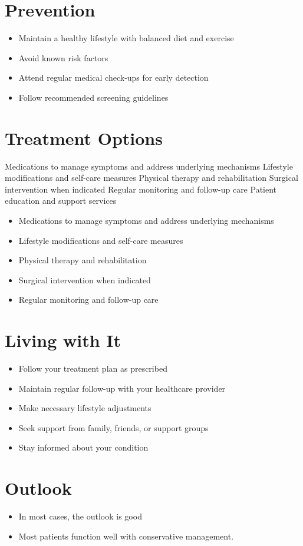 \section{Prevention}
\begin{itemize}[noitemsep]
  \item Maintain a healthy lifestyle with balanced diet and exercise
  \item Avoid known risk factors
  \item Attend regular medical check-ups for early detection
  \item Follow recommended screening guidelines
\end{itemize}
\section{Treatment Options}
Medications to manage symptoms and address underlying mechanisms Lifestyle modifications and self-care measures Physical therapy and rehabilitation Surgical intervention when indicated Regular monitoring and follow-up care Patient education and support services

\begin{itemize}[noitemsep]
  \item Medications to manage symptoms and address underlying mechanisms
  \item Lifestyle modifications and self-care measures
  \item Physical therapy and rehabilitation
  \item Surgical intervention when indicated
  \item Regular monitoring and follow-up care
\end{itemize}
\section{Living with It}
\begin{itemize}[noitemsep]
  \item Follow your treatment plan as prescribed
  \item Maintain regular follow-up with your healthcare provider
  \item Make necessary lifestyle adjustments
  \item Seek support from family, friends, or support groups
  \item Stay informed about your condition
\end{itemize}
\section{Outlook}
\begin{itemize}[noitemsep]
  \item In most cases, the outlook is good
  \item Most patients function well with conservative management.
\end{itemize}
